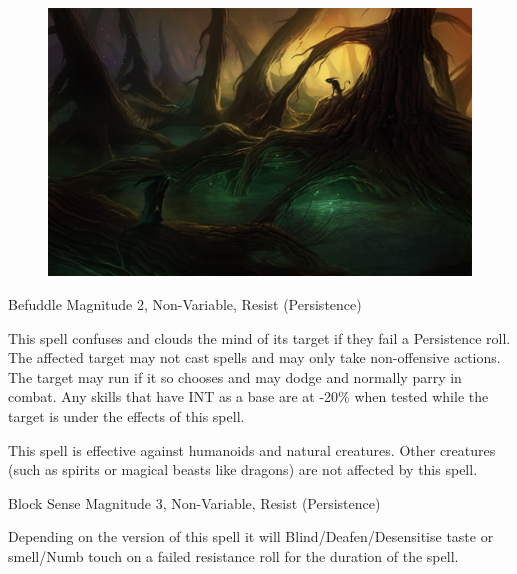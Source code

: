 \begin{figure}
\begin{center}
\includegraphics[scale=2.1]{img/mystical_forest_by_sirend.jpg}
\end{center}
\end{figure}


\begin{rpg-spell}
{Befuddle}
{Magnitude 2, Non-Variable, Resist (Persistence)}

This spell confuses and clouds the mind of its target if they fail a Persistence roll. The affected target may not cast spells and may only take non-offensive actions. The target may run if it so chooses and may dodge and normally parry in combat. Any skills that have INT as a base are at -20\% when tested while the target is under the effects of this spell.

This spell is effective against humanoids and natural creatures. Other creatures (such as spirits or magical beasts like dragons) are not affected by this spell.
\end{rpg-spell}


\begin{rpg-spell}
{Block Sense}
{Magnitude 3, Non-Variable, Resist (Persistence)}

Depending on the version of this spell it will Blind/Deafen/Desensitise taste or smell/Numb touch on a failed resistance roll for the duration of the spell.
\end{rpg-spell}


